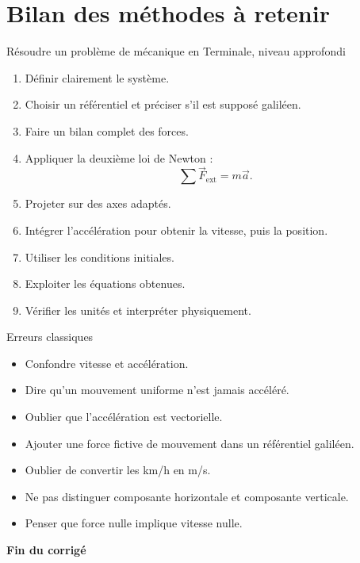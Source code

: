 \documentclass[11pt,a4paper]{article}
\begin{document}
\newpage
\section{Bilan des méthodes à retenir}

\begin{methodebox}{Résoudre un problème de mécanique en Terminale, niveau approfondi}
\begin{enumerate}
  \item Définir clairement le système.
  \item Choisir un référentiel et préciser s'il est supposé galiléen.
  \item Faire un bilan complet des forces.
  \item Appliquer la deuxième loi de Newton :
  \[
  \sum \vec F_{\text{ext}}=m\vec a.
  \]
  \item Projeter sur des axes adaptés.
  \item Intégrer l'accélération pour obtenir la vitesse, puis la position.
  \item Utiliser les conditions initiales.
  \item Exploiter les équations obtenues.
  \item Vérifier les unités et interpréter physiquement.
\end{enumerate}
\end{methodebox}

\begin{methodebox}{Erreurs classiques}
\begin{itemize}
  \item Confondre vitesse et accélération.
  \item Dire qu'un mouvement uniforme n'est jamais accéléré.
  \item Oublier que l'accélération est vectorielle.
  \item Ajouter une force fictive de mouvement dans un référentiel galiléen.
  \item Oublier de convertir les km/h en m/s.
  \item Ne pas distinguer composante horizontale et composante verticale.
  \item Penser que force nulle implique vitesse nulle.
\end{itemize}
\end{methodebox}

\begin{center}
\Large\textbf{Fin du corrigé}
\end{center}
\end{document}
